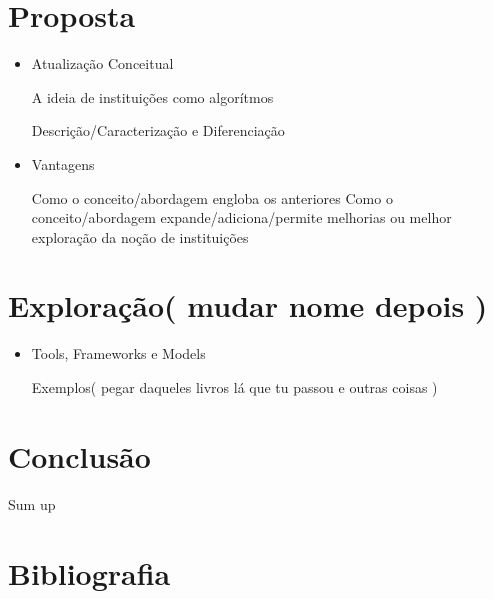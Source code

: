 \documentclass{article}
\begin{document}
\section{ Proposta }

\begin{itemize}

\item Atualização Conceitual

    \subitem A ideia de instituições como algorítmos
    
        \subsubitem Descrição/Caracterização e Diferenciação
        
\item Vantagens

    \subitem Como o conceito/abordagem engloba os anteriores
    \subitem Como o conceito/abordagem expande/adiciona/permite melhorias ou melhor exploração da noção de instituições

\end{itemize}

\section{ Exploração( mudar nome depois ) }

\begin{itemize}

\item Tools, Frameworks e Models

    \subitem Exemplos( pegar daqueles livros lá que tu passou e outras coisas )

\end{itemize}

\section{ Conclusão }

Sum up

\newpage

\section*{ Bibliografia }
\end{document}
